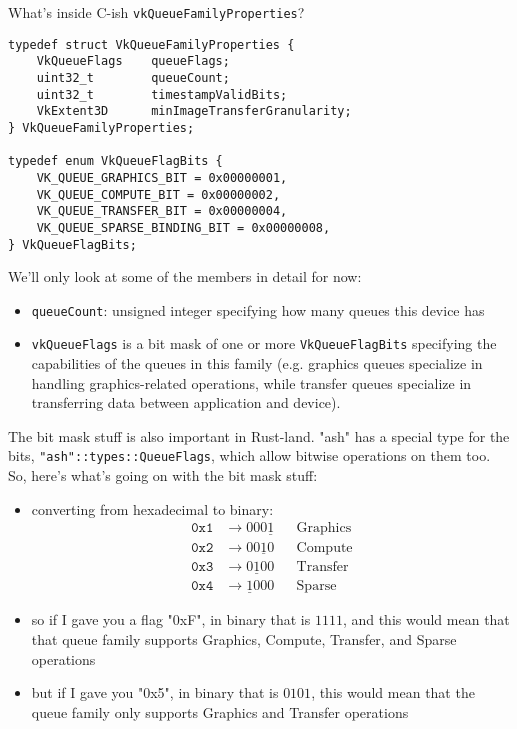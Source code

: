 \documentclass[12pt,letterpaper]{article}
\newcommand{\ril}[1]{\texttt{#1}}
\newcommand{\cil}[1]{\texttt{#1}}
\begin{document}
		What's inside C-ish \cil{vkQueueFamilyProperties}?
	\begin{verbatim}
typedef struct VkQueueFamilyProperties {
	VkQueueFlags    queueFlags;
	uint32_t        queueCount;
	uint32_t        timestampValidBits;
	VkExtent3D      minImageTransferGranularity;
} VkQueueFamilyProperties;

typedef enum VkQueueFlagBits {
	VK_QUEUE_GRAPHICS_BIT = 0x00000001,
	VK_QUEUE_COMPUTE_BIT = 0x00000002,
	VK_QUEUE_TRANSFER_BIT = 0x00000004,
	VK_QUEUE_SPARSE_BINDING_BIT = 0x00000008,
} VkQueueFlagBits;
	\end{verbatim}
	
		We'll only look at some of the members in detail for now:
			\begin{itemize}
				\item \cil{queueCount}: unsigned integer specifying how many queues this device has 
				\item \cil{vkQueueFlags} is a bit mask of one or more \cil{VkQueueFlagBits} specifying the capabilities of the queues in this family (e.g. graphics queues specialize in handling graphics-related operations, while transfer queues specialize in transferring data between application and device).
			\end{itemize}
		
		The bit mask stuff is also important in Rust-land. "ash" has a special type for the bits, \ril{"ash"::types::QueueFlags}, which allow bitwise operations on them too. So, here's what's going on with the bit mask stuff:
			\begin{itemize}
				\item converting from hexadecimal to binary:
					\begin{align*}
						\mathtt{0x1} &\rightarrow 000\underline{1} && \text{Graphics}\\
						\mathtt{0x2} &\rightarrow 00\underline{1}0 && \text{Compute}\\
						\mathtt{0x3} &\rightarrow 0\underline{1}00 && \text{Transfer}\\
						\mathtt{0x4} &\rightarrow \underline{1}000 && \text{Sparse}
					\end{align*}
				
				\item so if I gave you a flag "0xF", in binary that is $1111$, and this would mean that that queue family supports Graphics, Compute, Transfer, and Sparse operations
				
				\item but if I gave you "0x5", in binary that is $0101$, this would mean that the queue family only supports Graphics and Transfer operations
			\end{itemize}
		
\end{document}
